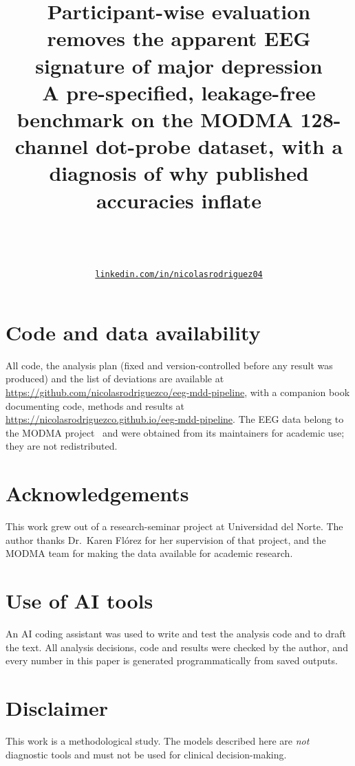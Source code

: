 \documentclass[11pt]{article}
\title{Participant-wise evaluation removes the apparent EEG signature of major depression\\[0.3em]
\large A pre-specified, leakage-free benchmark on the MODMA 128-channel dot-probe dataset, with a diagnosis of why
published accuracies inflate}
\author{\AuthorName~\orcidlink{\AuthorOrcid}\\\small\AuthorAffil\\\small\href{mailto:\AuthorEmail}{\texttt{\AuthorEmail}}\\\small\href{\AuthorLinkedIn}{\texttt{linkedin.com/in/nicolasrodriguez04}}}
\date{}
\begin{document}
\maketitle








\section*{Code and data availability}
All code, the analysis plan (fixed and version-controlled before any result was produced) and the list of deviations
are available at \url{https://github.com/nicolasrodriguezco/eeg-mdd-pipeline}, with a companion book documenting code, methods and results at \url{https://nicolasrodriguezco.github.io/eeg-mdd-pipeline}. The EEG data belong to the MODMA project~\cite{cai2022modma} and were
obtained from its maintainers for academic use; they are not redistributed.

\section*{Acknowledgements}
This work grew out of a research-seminar project at Universidad del Norte. The author thanks Dr.\ Karen Fl\'orez for
her supervision of that project, and the MODMA team for making the data available for academic research.

\section*{Use of AI tools}
An AI coding assistant was used to write and test the analysis code and to draft the text. All analysis
decisions, code and results were checked by the author, and every number in this paper is generated
programmatically from saved outputs.

\section*{Disclaimer}
This work is a methodological study. The models described here are \emph{not} diagnostic tools and must not be
used for clinical decision-making.




\appendix

\end{document}
